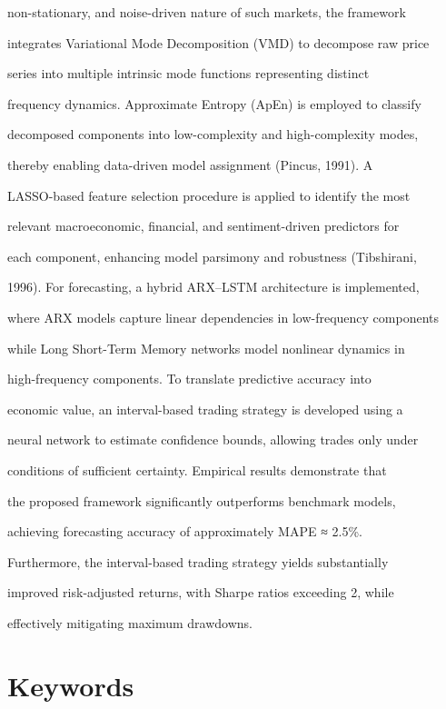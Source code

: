 non-stationary, and noise-driven nature of such markets, the framework

integrates Variational Mode Decomposition (VMD) to decompose raw price

series into multiple intrinsic mode functions representing distinct

frequency dynamics. Approximate Entropy (ApEn) is employed to classify

decomposed components into low-complexity and high-complexity modes,

thereby enabling data-driven model assignment (Pincus, 1991). A

LASSO-based feature selection procedure is applied to identify the most

relevant macroeconomic, financial, and sentiment-driven predictors for

each component, enhancing model parsimony and robustness (Tibshirani,

1996). For forecasting, a hybrid ARX--LSTM architecture is implemented,

where ARX models capture linear dependencies in low-frequency components

while Long Short-Term Memory networks model nonlinear dynamics in

high-frequency components. To translate predictive accuracy into

economic value, an interval-based trading strategy is developed using a

neural network to estimate confidence bounds, allowing trades only under

conditions of sufficient certainty. Empirical results demonstrate that

the proposed framework significantly outperforms benchmark models,

achieving forecasting accuracy of approximately MAPE ≈ 2.5\%.

Furthermore, the interval-based trading strategy yields substantially

improved risk-adjusted returns, with Sharpe ratios exceeding 2, while

effectively mitigating maximum drawdowns.



\section{Keywords}\label{keywords}



